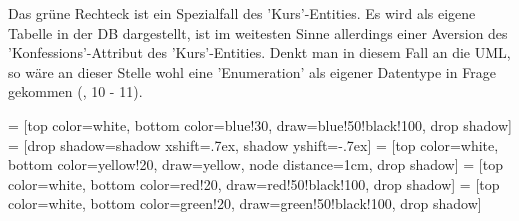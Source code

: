 Das grüne Rechteck ist ein Spezialfall des 'Kurs'-Entities. Es wird als eigene Tabelle in der \ac{DB} dargestellt, ist im weitesten Sinne allerdings einer Aversion des 'Konfessions'-Attribut des 'Kurs'-Entities. Denkt man in diesem Fall an die \ac{UML}, so wäre an dieser Stelle wohl eine 'Enumeration' als eigener Datentype in Frage gekommen (\cite{BalzertH_UML2}, 10 - 11).

 = [top color=white, bottom color=blue!30, draw=blue!50!black!100, drop shadow]
 = [drop shadow={shadow xshift=.7ex, shadow yshift=-.7ex}]
 = [top color=white, bottom color=yellow!20, draw=yellow, node distance=1cm, drop shadow]
 = [top color=white, bottom color=red!20, draw=red!50!black!100, drop shadow]
 = [top color=white, bottom color=green!20, draw=green!50!black!100, drop shadow]
